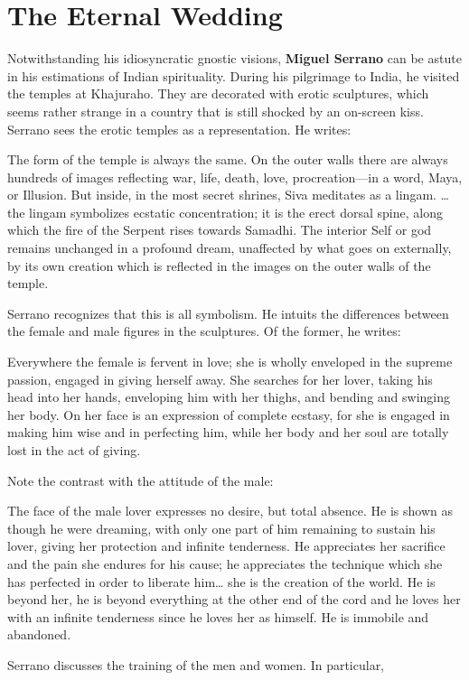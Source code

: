 \section{The Eternal Wedding}

Notwithstanding his idiosyncratic gnostic visions, \textbf{Miguel Serrano} can be astute in his estimations of Indian spirituality. During his pilgrimage to India, he visited the temples at Khajuraho. They are decorated with erotic sculptures, which seems rather strange in a country that is still shocked by an on-screen kiss. Serrano sees the erotic temples as a representation. He writes:

\begin{quotex}
The form of the temple is always the same. On the outer walls there are always hundreds of images reflecting war, life, death, love, procreation—in a word, Maya, or Illusion. But inside, in the most secret shrines, Siva meditates as a lingam. … the lingam symbolizes ecstatic concentration; it is the erect dorsal spine, along which the fire of the Serpent rises towards Samadhi. The interior Self or god remains unchanged in a profound dream, unaffected by what goes on externally, by its own creation which is reflected in the images on the outer walls of the temple. 

\end{quotex}
Serrano recognizes that this is all symbolism. He intuits the differences between the female and male figures in the sculptures. Of the former, he writes:

\begin{quotex}
Everywhere the female is fervent in love; she is wholly enveloped in the supreme passion, engaged in giving herself away. She searches for her lover, taking his head into her hands, enveloping him with her thighs, and bending and swinging her body. On her face is an expression of complete ecstasy, for she is engaged in making him wise and in perfecting him, while her body and her soul are totally lost in the act of giving. 

\end{quotex}
Note the contrast with the attitude of the male:

\begin{quotex}
The face of the male lover expresses no desire, but total absence. He is shown as though he were dreaming, with only one part of him remaining to sustain his lover, giving her protection and infinite tenderness. He appreciates her sacrifice and the pain she endures for his cause; he appreciates the technique which she has perfected in order to liberate him… she is the creation of the world. He is beyond her, he is beyond everything at the other end of the cord and he loves her with an infinite tenderness since he loves her as himself. He is immobile and abandoned. 

\end{quotex}
Serrano discusses the training of the men and women. In particular,

